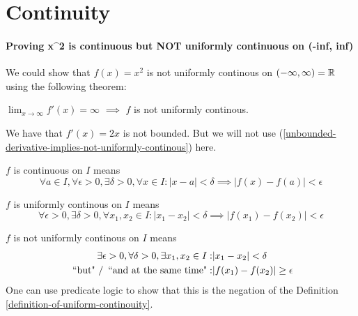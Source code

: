 \chapter{Continuity}
\subsubsection*{Proving x^{}2 is continuous but NOT uniformly continuous on (-inf, inf)}
We could show that $f(x)=x^{2}$ is not uniformly continous on $(-\infty, \infty)
= \mathbb{R}$ using the following theorem:

\begin{thm}
  \label{unbounded-derivative-implies-not-uniformly-continous} $\lim_{x \to
    \infty}f'(x) = \infty$ $\implies$ $f$ is not uniformly continous.
\end{thm}
We have that $f'(x)=2x$ is not bounded. But we will not use (\ref{unbounded-derivative-implies-not-uniformly-continous})
here.

\begin{mydef}
  \label{definition-of-continouity} $f$ is continuous on $I$ means
  \begin{equation}
    \forall a \in I, \forall \epsilon > 0, \exists \delta > 0, \forall x \in I :
    | x-a | < \delta \implies |f(x) - f(a)| < \epsilon
  \end{equation}
\end{mydef}

\begin{mydef}
  \label{definition-of-uniform-continouity} $f$ is uniformly continous on $I$ means
  \begin{equation}
    \forall \epsilon > 0, \exists \delta > 0, \forall x_{1}, x_{2} \in I: |x_{1}-
    x_{2}| < \delta \implies |f(x_{1}) - f(x_{2})| < \epsilon
  \end{equation}
\end{mydef}

\begin{mydef}
  \label{definition-of-non-uniform-continouity} $f$ is not uniformly continous on
  $I$ means
  \begin{equation}
    \label{equation-of-non-uniform-continouity}
    \begin{aligned}
      \exists \epsilon > 0, \forall \delta > 0, \exists x_{1}, x_{2} \in I: & |x_{1} - x_{2}| < \delta           \\
      \text{ ``but" \slash $\,$ ``and at the same time"}:                   & |f(x_{1})- f(x_{2})| \geq \epsilon
    \end{aligned}
  \end{equation}
  One can use predicate logic to show that this is the negation of the Definition
  \ref{definition-of-uniform-continouity}.
\end{mydef}

